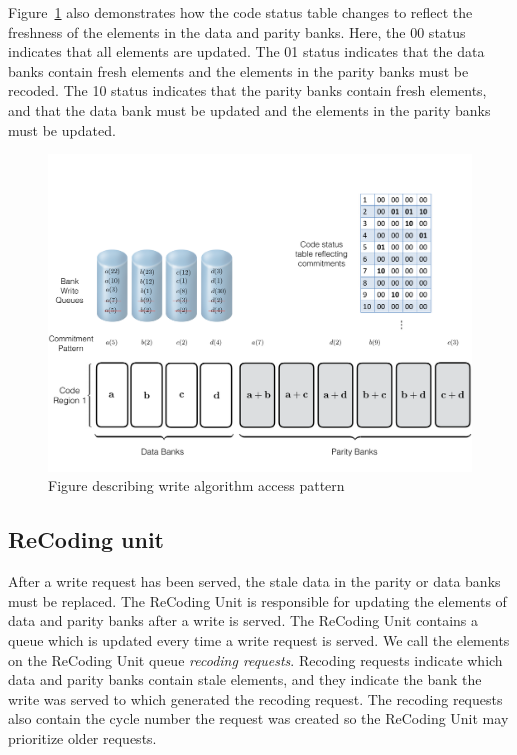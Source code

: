 Figure~\ref{fig:writeAlgoAccessPattern} also demonstrates how the code status table changes to reflect the freshness of the elements in the data and parity banks. Here, the 00 status indicates that all elements are updated. The 01 status indicates that the data banks contain fresh elements and the elements in the parity banks must be recoded. The 10 status indicates that the parity banks contain fresh elements, and that the data bank must be updated and the elements in the parity banks must be updated.

\begin{figure}[t!]
\centering
         \includegraphics[width=\linewidth]{fig/Write-Algo-Example.pdf}
	\caption{Figure describing write algorithm access pattern}
	\label{fig:writeAlgoAccessPattern}
\end{figure}
\subsection{ReCoding unit}
\label{sec:recoding}
After a write request has been served, the stale data in the parity or data banks must be replaced. The ReCoding Unit is responsible for updating the elements of data and parity banks after a write is served. The ReCoding Unit contains a queue which is updated every time a write request is served. We call the elements on the ReCoding Unit queue {\em recoding requests}. Recoding requests indicate which data and parity banks contain stale elements, and they indicate the bank the write was served to which generated the recoding request. The recoding requests also contain the cycle number the request was created so the ReCoding Unit may prioritize older requests. 

